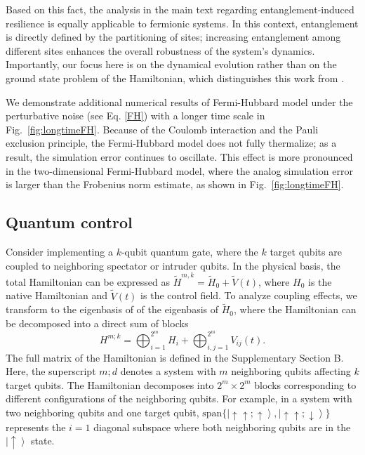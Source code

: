 \documentclass[12pt]{article}
\begin{document}
Based on this fact, the analysis in the main text regarding entanglement-induced resilience is equally applicable to fermionic systems. In this context, entanglement is directly defined by the partitioning of sites; increasing entanglement among different sites enhances the overall robustness of the system's dynamics. Importantly, our focus here is on the dynamical evolution rather than on the ground state problem of the Hamiltonian, which distinguishes this work from \cite{HaiqingLin2004PhysRevLett.93.086402}.

We demonstrate additional numerical results of Fermi-Hubbard model under the perturbative noise (see Eq. \eqref{FH}) with a longer time scale in Fig.~\ref{fig:longtimeFH}. Because of the Coulomb interaction and the Pauli exclusion principle, the Fermi-Hubbard model does not fully thermalize; as a result, the simulation error continues to oscillate. This effect is more pronounced in the two-dimensional Fermi-Hubbard model, where the analog simulation error is larger than the Frobenius norm estimate, as shown in Fig.~\ref{fig:longtimeFH}.


\subsection*{Quantum control}









Consider implementing a $k$-qubit quantum gate, where the $k$ target qubits are coupled to neighboring spectator or intruder qubits. In the physical basis, the total Hamiltonian can be expressed as   $\tilde{H}^{m,k}=\tilde{H}_0+\tilde{V}(t)$, where $H_0$ is the native Hamiltonian and $\tilde{V}(t)$ is the control field.
To analyze coupling effects, we transform to the eigenbasis of of the eigenbasis of $\tilde{H}_0$, where the Hamiltonian can be decomposed into a direct sum of blocks \cite{hai2025scalablerobustquantumcontrol}
\begin{equation}
H^{m;k} = \bigoplus_{i=1}^{2^m} H_i + \bigoplus_{i,j=1}^{2^m} V_{ij}(t)
           \label{Eq_GeneralH}.
\end{equation}
The full matrix of the Hamiltonian is defined in the Supplementary Section B.
Here, the superscript $m;d$ denotes a system with $m$ neighboring qubits affecting $k$ target qubits. The Hamiltonian decomposes into $2^m\times2^m$ blocks corresponding to different configurations of the neighboring qubits. For example, in a system with two neighboring qubits and one target qubit, $\text{span}\{\left|\uparrow\uparrow;\uparrow\right\rangle, \left|\uparrow\uparrow;\downarrow\right\rangle\}$ represents the $i=1$ diagonal subspace where both neighboring qubits are in the $\left|\uparrow\right\rangle$ state.
\end{document}
